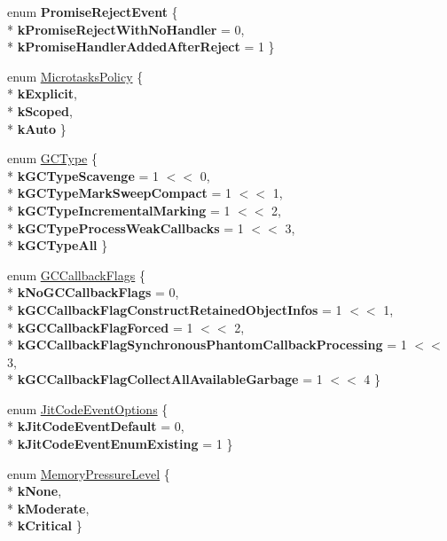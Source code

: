 \begin{DoxyCompactItemize}
\item 
enum {\bfseries Promise\+Reject\+Event} \{ \\*
{\bfseries k\+Promise\+Reject\+With\+No\+Handler} = 0, 
\\*
{\bfseries k\+Promise\+Handler\+Added\+After\+Reject} = 1
 \}\hypertarget{namespacev8_a307b3674d4966684f8170a4fbd932eaf}{}\label{namespacev8_a307b3674d4966684f8170a4fbd932eaf}

\item 
enum \hyperlink{namespacev8_a2f183b102b3d1b7a30a805e8c53c04da}{Microtasks\+Policy} \{ \\*
{\bfseries k\+Explicit}, 
\\*
{\bfseries k\+Scoped}, 
\\*
{\bfseries k\+Auto}
 \}
\item 
enum \hyperlink{namespacev8_ac109d6f27e0c0f9ef4e98bcf7a806cf2}{G\+C\+Type} \{ \\*
{\bfseries k\+G\+C\+Type\+Scavenge} = 1 $<$$<$ 0, 
\\*
{\bfseries k\+G\+C\+Type\+Mark\+Sweep\+Compact} = 1 $<$$<$ 1, 
\\*
{\bfseries k\+G\+C\+Type\+Incremental\+Marking} = 1 $<$$<$ 2, 
\\*
{\bfseries k\+G\+C\+Type\+Process\+Weak\+Callbacks} = 1 $<$$<$ 3, 
\\*
{\bfseries k\+G\+C\+Type\+All}
 \}
\item 
enum \hyperlink{namespacev8_a247c37a849f4d6c293b9b16e94e1944b}{G\+C\+Callback\+Flags} \{ \\*
{\bfseries k\+No\+G\+C\+Callback\+Flags} = 0, 
\\*
{\bfseries k\+G\+C\+Callback\+Flag\+Construct\+Retained\+Object\+Infos} = 1 $<$$<$ 1, 
\\*
{\bfseries k\+G\+C\+Callback\+Flag\+Forced} = 1 $<$$<$ 2, 
\\*
{\bfseries k\+G\+C\+Callback\+Flag\+Synchronous\+Phantom\+Callback\+Processing} = 1 $<$$<$ 3, 
\\*
{\bfseries k\+G\+C\+Callback\+Flag\+Collect\+All\+Available\+Garbage} = 1 $<$$<$ 4
 \}
\item 
enum \hyperlink{namespacev8_a06f34fa4fa4cfc8518366808d1d461c1}{Jit\+Code\+Event\+Options} \{ \\*
{\bfseries k\+Jit\+Code\+Event\+Default} = 0, 
\\*
{\bfseries k\+Jit\+Code\+Event\+Enum\+Existing} = 1
 \}
\item 
enum \hyperlink{namespacev8_ae0e9a25bf51e518585f555806e7dc7b9}{Memory\+Pressure\+Level} \{ \\*
{\bfseries k\+None}, 
\\*
{\bfseries k\+Moderate}, 
\\*
{\bfseries k\+Critical}
 \}
\end{DoxyCompactItemize}

